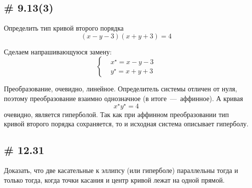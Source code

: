 \documentclass[a4paper,12pt]{article}
\begin{document}
  
  \subsection{\# 9.13(3)}
  
  Определить тип кривой второго порядка
  \[
    (x - y - 3)(x + y + 3) = 4
  \]
  
  \begin{solution}
    Сделаем напрашивающуюся замену:
    \[
      \left\{
        \begin{aligned}
          &x^\star = x - y - 3\\
          &y^\star = x + y + 3
        \end{aligned}
      \right.
    \]
    
    Преобразование, очевидно, линейное.
    Определитель системы отличен от нуля, поэтому преобразование взаимно однозначное (в итоге~---~аффинное).
    А кривая
    \[
      x^\star y^\star = 4
    \]
    очевидно, является гиперболой.
    Так как при аффинном преобразовании тип кривой второго порядка сохраняется, то и исходная система описывает гиперболу.
  \end{solution}
  
  
  \subsection{\# 12.31}
  
  Доказать, что две касательные к эллипсу (или гиперболе) параллельны тогда и только тогда, когда точки касания и центр кривой лежат на одной прямой.
  
\end{document}
